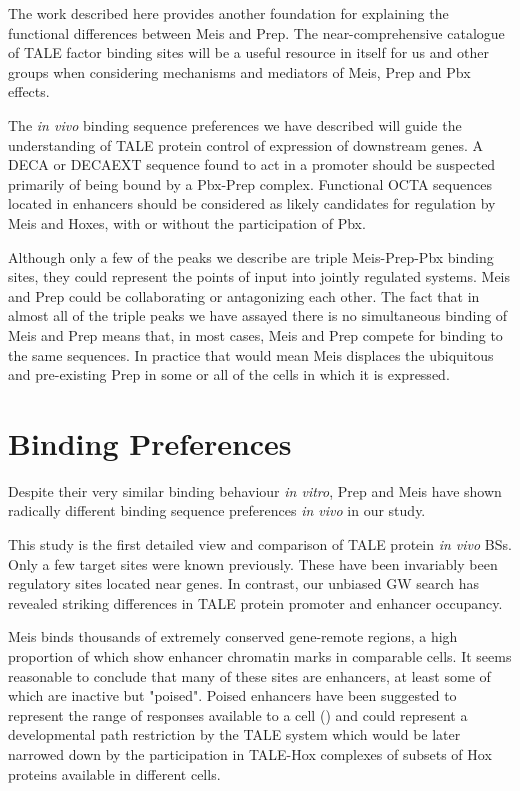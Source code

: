 The work described here provides another foundation for explaining the functional differences between Meis and Prep. The near-comprehensive catalogue of \ac{TALE} factor binding sites will be a useful resource in itself for us and other groups when considering mechanisms and mediators of Meis, Prep and Pbx effects. 

The \textit{in vivo} binding sequence preferences we have  described will guide the understanding of \ac{TALE} protein control of expression of downstream genes. A \ac{DECA} or \ac{DECAEXT} sequence found to act in a promoter should be suspected primarily of being bound by a Pbx-Prep complex. Functional \ac{OCTA} sequences located in enhancers should be considered as likely candidates for regulation by Meis and Hoxes, with or without the participation of Pbx. 

Although only a few of the peaks we describe are triple Meis-Prep-Pbx binding sites, they could represent the points of input into jointly regulated systems. Meis and Prep could be collaborating or antagonizing each other. The fact that in almost all of the triple peaks we have assayed there is no simultaneous binding of Meis and Prep means that, in most cases, Meis and Prep compete for binding to the same sequences. In practice that would mean Meis displaces the ubiquitous and pre-existing Prep in some or all of the cells in which it is expressed. 

\section{Binding Preferences}

Despite their very similar binding behaviour \textit{in vitro}, Prep and Meis have shown radically different binding sequence preferences \textit{in vivo} in our study. 

This study is the first detailed view and comparison of \ac{TALE} protein \textit{in vivo} \acp{BS}. Only a few target sites were known previously. These have been invariably been regulatory sites located near genes. In contrast, our unbiased \ac{GW} search has revealed striking differences in \ac{TALE} protein promoter and enhancer occupancy. 

Meis binds thousands of extremely conserved gene-remote regions, a high proportion of which show enhancer chromatin marks in comparable cells. It seems reasonable to conclude that many of these sites are enhancers, at least some of which are inactive but "poised". Poised enhancers have been suggested to represent the range of responses available to a cell (\cite{Creyghton2010}) and could represent a developmental path restriction by the \ac{TALE} system which would be later narrowed down by the participation in \ac{TALE}-Hox complexes of subsets of Hox proteins available in different cells. 

